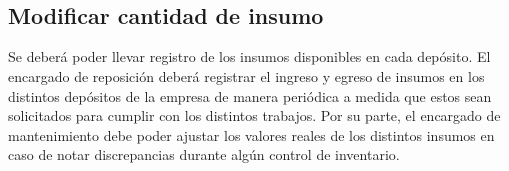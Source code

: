 \documentclass[a4paper, 12pt,twoside]{report}  %
\numberwithin{equation}{subsection} %
\begin{document}
\indent
\\\\\\\\\\\\\\\\\\\\\\\\
\pagebreak

\subsection*{Modificar cantidad de insumo}
Se deberá poder llevar registro de los insumos disponibles en cada depósito. El encargado de reposición deberá registrar el ingreso y egreso de insumos en los distintos depósitos de la empresa de manera periódica a medida que estos sean solicitados para cumplir con los distintos trabajos. Por su parte, el encargado de mantenimiento debe poder ajustar los valores reales de los distintos insumos en caso de notar discrepancias durante algún control de inventario.

\renewcommand{\arraystretch}{1.4}
\end{document}
